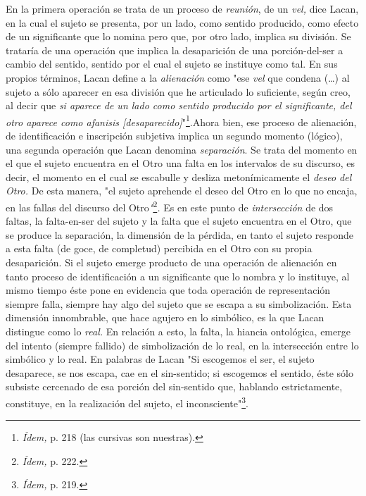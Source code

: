 \documentclass{book}
\begin{document}
En la primera operación se trata de un proceso de \emph{reunión}, de un
\emph{vel,} dice Lacan, en la cual el sujeto se presenta, por un lado,
como sentido producido, como efecto de un significante que lo nomina
pero que, por otro lado, implica su división\emph{.} Se trataría de una
operación que implica la desaparición de una porción-del-ser a cambio
del sentido, sentido por el cual el sujeto se instituye como tal. En sus
propios términos, Lacan define a la \emph{alienación} como "ese
\emph{vel} que condena (\dots) al sujeto a sólo aparecer en esa
división que he articulado lo suficiente, según creo, al decir que
\emph{si aparece de un lado como sentido producido por el significante,
del otro aparece como afanisis {[}desaparecido{]}}"\footnote{\emph{Ídem,}
  p. 218 (las cursivas son nuestras).}.Ahora bien, ese proceso de
alienación, de identificación e inscripción subjetiva implica un segundo
momento (lógico), una segunda operación que Lacan denomina
\emph{separación}. Se trata del momento en el que el sujeto encuentra en
el Otro una falta en los intervalos de su discurso, es decir, el momento
en el cual se escabulle y desliza metonímicamente el \emph{deseo del
Otro.} De esta manera, "el sujeto aprehende el deseo del Otro en lo que
no encaja, en las fallas del discurso del
Otro\emph{"}\footnote{\emph{Ídem,} p. 222.}\emph{.} Es en este punto de
\emph{intersección} de dos faltas, la falta-en-ser del sujeto y la falta
que el sujeto encuentra en el Otro, que se produce la separación, la
dimensión de la pérdida, en tanto el sujeto responde a esta falta (de
goce, de completud) percibida en el Otro con su propia desaparición. Si
el sujeto emerge producto de una operación de alienación en tanto
proceso de identificación a un significante que lo nombra y lo
instituye, al mismo tiempo éste pone en evidencia que toda operación de
representación siempre falla, siempre hay algo del sujeto que se escapa
a su simbolización. Esta dimensión innombrable, que hace agujero en lo
simbólico, es la que Lacan distingue como lo \emph{real.} En relación a
esto, la falta, la hiancia ontológica, emerge del intento (siempre
fallido) de simbolización de lo real, en la intersección entre lo
simbólico y lo real. En palabras de Lacan "Si escogemos el ser, el
sujeto desaparece, se nos escapa, cae en el sin-sentido; si escogemos el
sentido, éste sólo subsiste cercenado de esa porción del sin-sentido
que, hablando estrictamente, constituye, en la realización del sujeto,
el inconsciente"\footnote{\emph{Ídem,} p. 219.}.
\end{document}
